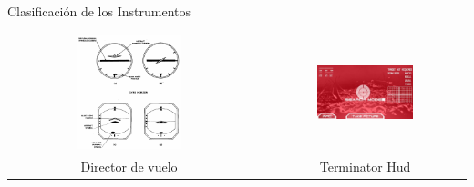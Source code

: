 \begin{frame}{Clasificaci\'on de los Instrumentos}

  \begin{tabular}{ccc}
    \includegraphics[width=0.45\textwidth]{imagenes/1.2.clasificacion.instrumentos/director.png} & \hspace{3mm}
&     \includegraphics[width=0.5\textwidth]{imagenes/1.2.clasificacion.instrumentos/terminator_hud.png}
\\
\parbox{0.45\textwidth}{Director de vuelo}
&
& Terminator Hud
\\
  \end{tabular}

\end{frame}

